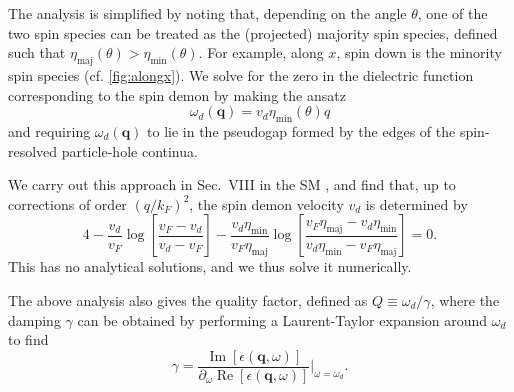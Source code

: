 \documentclass[aps,prl,reprint,twocolumns,superscriptaddress]{revtex4-2}
\newcommand{\deltaq}{\eta_{{\mathrm{min}}}(\theta)/\eta_{{\mathrm{maj}}}(\theta)}
\DeclareMathOperator{\Imm}{Im}
\DeclareMathOperator{\Ree}{Re}
\newcommand{\kF}{k_{F}}
\newcommand{\vs}{v_d}
\newcommand{\subfigref}[2]{Fig.~\hyperref[#1]{\ref*{#1}#2}}
\begin{document}
	The analysis is simplified by noting that, depending on the angle $\theta$, one of the two spin species can be treated as the (projected) majority spin species, defined such that $\eta_{{\mathrm{maj}}}(\theta)>\eta_{{\mathrm{min}}}(\theta)$. For example, along $x$, spin down is the minority spin species (cf. \cref{fig:alongx}).
	We solve for the zero in the dielectric function corresponding to the spin demon by making the ansatz \cite{santoroAcousticPlasmonsConducting1988}
	\begin{equation}
		\omega_{d}(\bm q)=\vs \eta_{{\mathrm{min}}}(\theta)q
	\end{equation}
	and requiring $\omega_{d}(\bm q)$ to lie in the pseudogap formed by the edges of the spin-resolved particle-hole continua.
	
	We carry out this approach in Sec.~VIII in the SM \cite{Note1}, and find that, up to corrections of order $(q/\kF)^2$, the spin demon velocity $\vs$ is determined by 
	\begin{equation}
		4 -\frac{\vs}{v_F} \log\left[\frac{v_F-\vs}{\vs-v_F}\right] - \frac{\vs\eta_{{\mathrm{min}}}}{v_F\eta_{{\mathrm{maj}}}} \log\left[\frac{v_F\eta_{{\mathrm{maj}}}-\vs\eta_{{\mathrm{min}}}}{\vs\eta_{{\mathrm{min}}}-v_F\eta_{{\mathrm{maj}}}}\right] = 0. \label{eq:zeros-vs}
	\end{equation}
	This has no analytical solutions, and we thus solve it numerically.
	
	
	
	
	
	The above analysis also gives the quality factor, defined as $Q \equiv \omega_d / \gamma$, where the damping $\gamma$ can be obtained by performing a Laurent-Taylor expansion around $\omega_d$ to find 
	\begin{equation}
		\gamma = \frac{\Imm[\epsilon(\bm q,\omega)]}{\partial_\omega \Ree[\epsilon(\bm q,\omega)]}\Bigr|_{\omega=\omega_d}.
	\end{equation}
	
\end{document}
